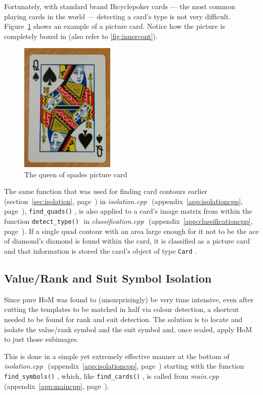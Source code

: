 \documentclass[a4paper,12pt,notitlepage]{article}
\newcommand{\source}[2]{\emph{#1 } (appendix~\ref{#2}, page~\pageref{#2})}
\newcommand{\secref}[1]{(section~\ref{#1}, page~\pageref{#1})}
\newcommand{\code}[1]{\colorbox{white}{\lstinline[basicstyle=\ttfamily\color{black}]|#1|} }
\begin{document}
		Fortunately, with standard brand Bicycle\textregistered poker cards --- the most common playing cards in the world --- detecting a card's type is not very difficult. Figure~\ref{fig:picture} shows an example of a picture card. Notice how the picture is completely boxed in (also refer to \ref{fig:innercont}).

		\begin{figure}[H]
			\centering
			\includegraphics[width=0.4\textwidth]{picture}
			\caption{The queen of spades picture card}
			\label{fig:picture}
		\end{figure}

		The same function that was used for finding card contours earlier \secref{sec:isolation} in \source{isolation.cpp}{app:isolationcpp}, \code{find_quads()}, is also applied to a card's image matrix from within the function \code{detect_type()} in \source{classification.cpp}{app:classificationcpp}. If a single quad contour with an area large enough for it not to be the ace of diamond's diamond is found within the card, it is classified as a picture card and that information is stored the card's object of type \code{Card}.
	\subsection{Value/Rank and Suit Symbol Isolation}
		Since pure HoM was found to (unsurprisingly) be very time intensive, even after cutting the templates to be matched in half via colour detection, a shortcut needed to be found for rank and suit detection. The solution is to locate and isolate the value/rank symbol and the suit symbol and, once scaled, apply HoM to just those subimages.

		This is done in a simple yet extremely effective manner at the bottom of \source{isolation.cpp}{app:isolationcpp} starting with the function \code{find_symbols()}, which, like \code{find_cards()}, is called from \source{main.cpp}{app:maincpp}.
\end{document}

